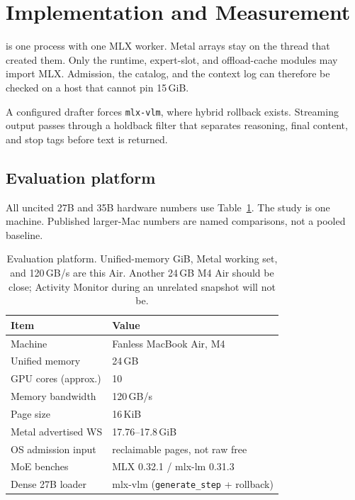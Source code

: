 \section{Implementation and Measurement}
\label{sec:impl}

\slotbank{} is one process with one MLX worker. Metal arrays stay on the thread that created them. Only the runtime, expert-slot, and offload-cache modules may import MLX. Admission, the catalog, and the context log can therefore be checked on a host that cannot pin 15\,GiB.

A configured drafter forces \texttt{mlx-vlm}, where hybrid rollback exists. Streaming output passes through a holdback filter that separates reasoning, final content, and stop tags before text is returned.

\subsection{Evaluation platform}

All uncited 27B and 35B hardware numbers use Table~\ref{tab:host}. The study is one machine. Published larger-Mac numbers are named comparisons, not a pooled baseline.

\begin{table}[t]
\centering
\caption{Evaluation platform. Unified-memory GiB, Metal working set, and 120\,GB/s are this Air. Another 24\,GB M4 Air should be close; Activity Monitor during an unrelated snapshot will not be.}
\label{tab:host}
\small
\begin{tabular}{@{}ll@{}}
\toprule
Item & Value \\
\midrule
Machine & Fanless MacBook Air, M4 \\
Unified memory & 24\,GB \\
GPU cores (approx.) & 10 \\
Memory bandwidth & 120\,GB/s \\
Page size & 16\,KiB \\
Metal advertised WS & 17.76--17.8\,GiB \\
OS admission input & reclaimable pages, not raw free \\
MoE benches & MLX 0.32.1 / mlx-lm 0.31.3 \\
Dense 27B loader & mlx-vlm (\texttt{generate\_step} + rollback) \\
\bottomrule
\end{tabular}
\end{table}

